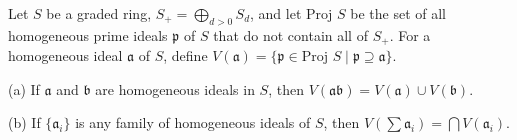 Let $S$ be a graded ring, $S_+ = \bigoplus_{d > 0} S_d$, and let $\text{Proj } S$ be the set of all homogeneous prime ideals $\mathfrak{p}$ of $S$ that do not contain all of $S_+$. For a homogeneous ideal $\mathfrak{a}$ of $S$, define $V(\mathfrak{a}) = \{\mathfrak{p} \in \text{Proj } S \mid \mathfrak{p} \supseteq \mathfrak{a}\}$.

(a) If $\mathfrak{a}$ and $\mathfrak{b}$ are homogeneous ideals in $S$, then $V(\mathfrak{ab}) = V(\mathfrak{a}) \cup V(\mathfrak{b})$.

(b) If $\{\mathfrak{a}_i\}$ is any family of homogeneous ideals of $S$, then $V(\sum \mathfrak{a}_i) = \bigcap V(\mathfrak{a}_i)$.
